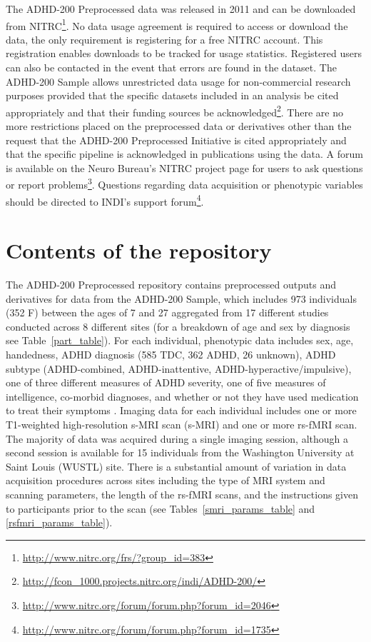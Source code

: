 \documentclass[preprint,12pt,3p]{elsarticle}
\begin{document}
The ADHD-200 Preprocessed data was released in 2011 and can be downloaded from NITRC\footnote{\url{http://www.nitrc.org/frs/?group_id=383}}. No data usage agreement is required to access or download the data, the only requirement is registering for a free NITRC account. This registration enables downloads to be tracked for usage statistics. Registered users can also be contacted in the event that errors are found in the dataset. The ADHD-200 Sample allows unrestricted data usage for non-commercial research purposes provided that the specific datasets included in an analysis be cited appropriately and that their funding sources be acknowledged\footnote{\url{http://fcon_1000.projects.nitrc.org/indi/ADHD-200/}}. There are no more restrictions placed on the preprocessed data or derivatives other than the request that the ADHD-200 Preprocessed Initiative is cited appropriately and that the specific pipeline is acknowledged in publications using the data. A forum is available on the Neuro Bureau's NITRC project page for users to ask questions or report problems\footnote{\url{http://www.nitrc.org/forum/forum.php?forum_id=2046}}. Questions regarding data acquisition or phenotypic variables should be directed to INDI's support forum\footnote{\url{http://www.nitrc.org/forum/forum.php?forum_id=1735}}. 


\section{Contents of the repository}

The ADHD-200 Preprocessed repository contains preprocessed outputs and derivatives for data from the ADHD-200 Sample, which includes 973 individuals (352 F) between the ages of 7 and 27 aggregated from 17 different studies conducted across 8 different sites (for a breakdown of age and sex by diagnosis see Table~\ref{part_table}). For each individual, phenotypic data includes sex, age, handedness, ADHD diagnosis (585 TDC, 362 ADHD, 26 unknown), ADHD subtype (ADHD-combined, ADHD-inattentive, ADHD-hyperactive/impulsive), one of three different measures of ADHD severity, one of five measures of intelligence, co-morbid diagnoses, and whether or not they have used medication to treat their symptoms \cite{Milham2012}. Imaging data for each individual includes one or more T1-weighted high-resolution s-MRI scan (s-MRI) and one or more rs-fMRI scan. The majority of data was acquired during a single imaging session, although a second session is available for 15 individuals from the Washington University at Saint Louis (WUSTL) site. There is a substantial amount of variation in data acquisition procedures across sites including the type of MRI system and scanning parameters, the length of the rs-fMRI scans, and the instructions given to participants prior to the scan (see Tables~\ref{smri_params_table} and \ref{rsfmri_params_table}). 
\end{document}
